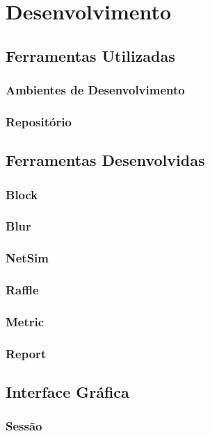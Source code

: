
\chapter{Desenvolvimento} %

\section{Ferramentas Utilizadas}
\subsection{Ambientes de Desenvolvimento}
\subsection{Repositório}

\section{Ferramentas Desenvolvidas}
\subsection{Block}
\subsection{Blur}
\subsection{NetSim}
\subsection{Raffle}
\subsection{Metric}
\subsection{Report}

\section{Interface Gráfica}
\subsection{Sessão}
